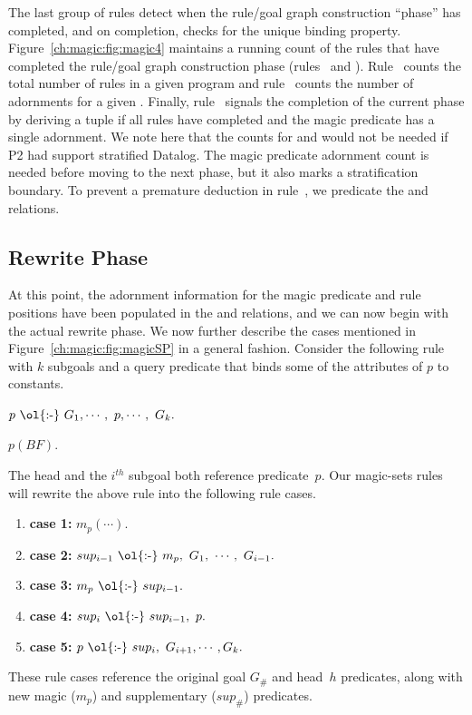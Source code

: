 The last group of rules detect when the rule/goal graph construction ``phase''
has completed, and on completion, checks for the unique binding property.
Figure~\ref{ch:magic:fig:magic4} maintains a running count of the rules that
have completed the rule/goal graph construction phase (rules~ and
).  Rule~ counts the total number of rules in a given program
and rule~ counts the number of adornments for a given .
Finally, rule~ signals the completion of the current phase by deriving
a  tuple if all rules have completed and the magic
predicate has a single adornment.  We note here that the counts for
 and  would not be needed if P2 had
support stratified Datalog.  The magic predicate adornment count is needed
before moving to the next phase, but it also marks a stratification boundary.
To prevent a premature  deduction in rule~, we
predicate the  and  relations.


\subsection{Rewrite Phase}
\label{ch:magic:sec:rewrite}
 
At this point, the adornment information for the magic predicate and rule positions
have been populated in the  and  relations, and we can now
begin with the actual rewrite phase.  We now further describe the cases mentioned
in Figure~\ref{ch:magic:fig:magicSP} in a general fashion. Consider the following rule with
$k$ subgoals and a query predicate that binds some of the attributes of $p$ to
constants.
\begin{trivlist}
\ssp
\item $p\ \text{\ol{:-}}\ G_1, \cdots,\ p, \cdots,\ G_k.$
\item $p(BF).$
\end{trivlist}
The head and the $i^{th}$ subgoal both reference predicate~$p$.  Our magic-sets
rules will rewrite the above rule into the following rule cases.
\begin{enumerate}
\ssp
\item {\bf case 1:} $m_p(\cdots).$ 
\item {\bf case 2:} $sup_{i-1}\ \text{\ol{:-}}\ m_p,\ G_1,\ \cdots,\ G_{i-1}.$ 
\item {\bf case 3:} $m_p\ \text{\ol{:-}}\ sup_{i-1}.$ 
\item {\bf case 4:} $sup_i\ \text{\ol{:-}}\ sup_{i-1},\ p.$ 
\item {\bf case 5:} $p\ \text{\ol{:-}}\ sup_i,\ G_{i+1}, \cdots, G_k.$ 
\end{enumerate}
These rule cases reference the original goal $G_{\#}$ and head~$h$ predicates,
along with new magic ($m_p$) and supplementary ($sup_{\#}$) predicates.  

